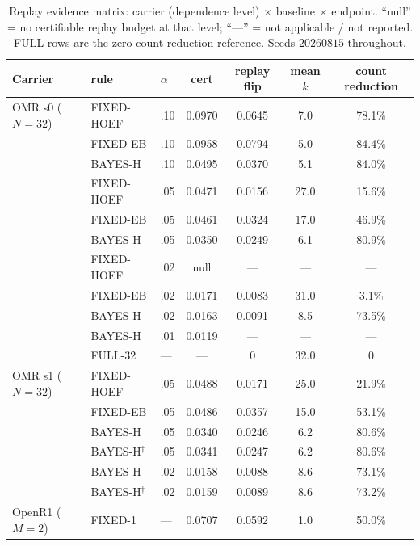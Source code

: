 \documentclass{article}
\theoremstyle{definition}
\theoremstyle{remark}
\begin{document}
\begin{table}[h]
\centering\small
\caption{Replay evidence matrix: carrier (dependence level) $\times$ baseline
$\times$ endpoint. ``null'' = no certifiable replay budget at that level;
``---'' = not applicable / not reported. FULL rows are the zero-count-reduction
reference. Seeds $20260815$ throughout.}
\label{tab:matrix}
\begin{tabular}{lllcccc}
\toprule
Carrier & rule & $\alpha$ & cert & replay flip & mean $k$ & count reduction \\
\midrule
OMR s0 ($N{=}32$)   & FIXED-HOEF & .10 & 0.0970 & 0.0645 & 7.0 & 78.1\% \\
                    & FIXED-EB   & .10 & 0.0958 & 0.0794 & 5.0 & 84.4\% \\
                    & BAYES-H    & .10 & 0.0495 & 0.0370 & 5.1 & 84.0\% \\
                    & FIXED-HOEF & .05 & 0.0471 & 0.0156 & 27.0 & 15.6\% \\
                    & FIXED-EB   & .05 & 0.0461 & 0.0324 & 17.0 & 46.9\% \\
                    & BAYES-H    & .05 & 0.0350 & 0.0249 & 6.1 & 80.9\% \\
                    & FIXED-HOEF & .02 & null & --- & --- & --- \\
                    & FIXED-EB   & .02 & 0.0171 & 0.0083 & 31.0 & 3.1\% \\
                    & BAYES-H    & .02 & 0.0163 & 0.0091 & 8.5 & 73.5\% \\
                    & BAYES-H    & .01 & 0.0119 & --- & --- & --- \\
                    & FULL-32    & --- & --- & 0 & 32.0 & 0 \\
\midrule
OMR s1 ($N{=}32$)   & FIXED-HOEF & .05 & 0.0488 & 0.0171 & 25.0 & 21.9\% \\
                    & FIXED-EB   & .05 & 0.0486 & 0.0357 & 15.0 & 53.1\% \\
                    & BAYES-H    & .05 & 0.0340 & 0.0246 & 6.2 & 80.6\% \\
                    & BAYES-H$^\dagger$ & .05 & 0.0341 & 0.0247 & 6.2 & 80.6\% \\
                    & BAYES-H    & .02 & 0.0158 & 0.0088 & 8.6 & 73.1\% \\
                    & BAYES-H$^\dagger$ & .02 & 0.0159 & 0.0089 & 8.6 & 73.2\% \\
\midrule
OpenR1 ($M{=}2$)    & FIXED-1    & --- & 0.0707 & 0.0592 & 1.0 & 50.0\% \\

\end{tabular}
\end{table}
\end{document}
